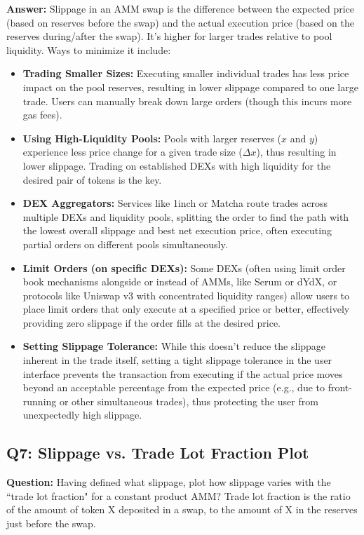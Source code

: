 \documentclass[12pt]{article}
\begin{document}
\textbf{Answer:} Slippage in an AMM swap is the difference between the expected price (based on reserves before the swap) and the actual execution price (based on the reserves during/after the swap). It's higher for larger trades relative to pool liquidity. Ways to minimize it include:
\begin{itemize}
    \item \textbf{Trading Smaller Sizes:} Executing smaller individual trades has less price impact on the pool reserves, resulting in lower slippage compared to one large trade. Users can manually break down large orders (though this incurs more gas fees).
    \item \textbf{Using High-Liquidity Pools:} Pools with larger reserves ($x$ and $y$) experience less price change for a given trade size ($\Delta x$), thus resulting in lower slippage. Trading on established DEXs with high liquidity for the desired pair of tokens is the key.
    \item \textbf{DEX Aggregators:} Services like 1inch or Matcha route trades across multiple DEXs and liquidity pools, splitting the order to find the path with the lowest overall slippage and best net execution price, often executing partial orders on different pools simultaneously.
    \item \textbf{Limit Orders (on specific DEXs):} Some DEXs (often using limit order book mechanisms alongside or instead of AMMs, like Serum or dYdX, or protocols like Uniswap v3 with concentrated liquidity ranges) allow users to place limit orders that only execute at a specified price or better, effectively providing zero slippage if the order fills at the desired price.
    \item \textbf{Setting Slippage Tolerance:} While this doesn't reduce the slippage inherent in the trade itself, setting a tight slippage tolerance in the user interface prevents the transaction from executing if the actual price moves beyond an acceptable percentage from the expected price (e.g., due to front-running or other simultaneous trades), thus protecting the user from unexpectedly high slippage.
\end{itemize}

\subsection{Q7: Slippage vs. Trade Lot Fraction Plot}
\textbf{Question:} Having defined what slippage, plot how slippage varies with the ``trade lot fraction" for a constant product AMM? Trade lot fraction is the ratio of the amount of token X deposited in a swap, to the amount of X in the reserves just before the swap.
\end{document}
